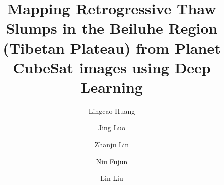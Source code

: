 \documentclass[preprint,12pt,authoryear]{elsarticle}
\begin{document}
\begin{frontmatter}




\title{Mapping Retrogressive Thaw Slumps in the Beiluhe Region (Tibetan Plateau) from Planet CubeSat images using Deep Learning}


\author[a]{Lingcao Huang}
\author[b]{Jing Luo}
\author[b]{Zhanju Lin}
\author[b]{Niu Fujun}
\author[a]{Lin Liu}


\address[a]{Earth System Science Programme, Faculty of Science, The Chinese University of Hong Kong, Hong Kong SAR, China.}
\address[b]{Northwest Institute of Eco-Environment and Resources, Chinese Academy of Sciences, LanZhou, China.}

\begin{abstract}


\end{abstract}
\end{frontmatter}
\end{document}

